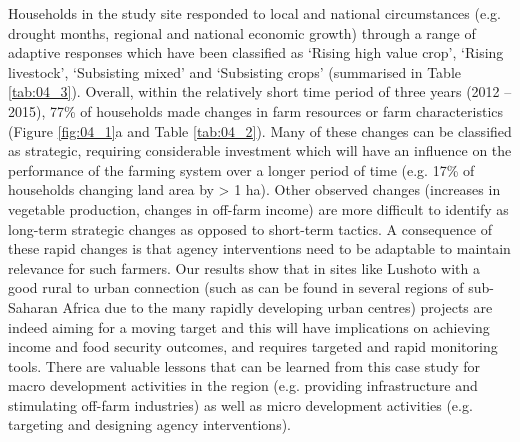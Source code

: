 Households in the study site responded to local and national circumstances (e.g. drought months, regional and national economic growth) through a range of adaptive responses which have been classified as `Rising high value crop', `Rising livestock', `Subsisting mixed' and `Subsisting crops' (summarised in Table \ref{tab:04_3}). Overall, within the relatively short time period of three years (2012 -- 2015), 77\% of households made changes in farm resources or farm characteristics (Figure \ref{fig:04_1}a and Table \ref{tab:04_2}). Many of these changes can be classified as strategic, requiring considerable investment which will have an influence on the performance of the farming system over a longer period of time (e.g. 17\% of households changing land area by {\textgreater} 1 ha). Other observed changes (increases in vegetable production, changes in off-farm income) are more difficult to identify as long-term strategic changes as opposed to short-term tactics. A consequence of these rapid changes is that agency interventions need to be adaptable to maintain relevance for such farmers. Our results show that in sites like Lushoto with a good rural to urban connection (such as can be found in several regions of sub-Saharan Africa due to the many rapidly developing urban centres) projects are indeed aiming for a moving target and this will have implications on achieving income and food security outcomes, and requires targeted and rapid monitoring tools. There are valuable lessons that can be learned from this case study for macro development activities in the region (e.g. providing infrastructure and stimulating off-farm industries) as well as micro development activities (e.g. targeting and designing agency interventions).


